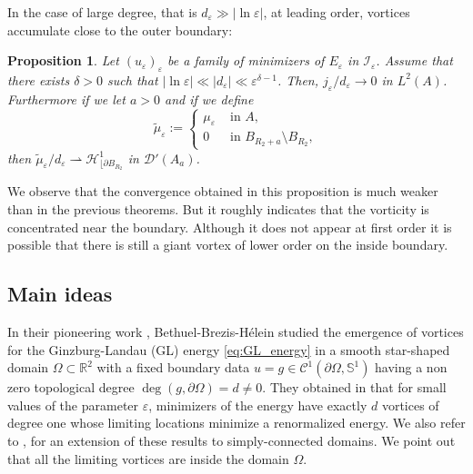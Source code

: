 \documentclass[12pt,reqno]{amsart}
\newtheorem{theorem}{Theorem}[section]
\newtheorem{proposition}[theorem]{Proposition}
\def\C{{\mathcal C}}
\def \O{{\Omega}}
\def\I{{\mathcal I}}
\def\e {{\varepsilon}}
\def \p {\partial}
\newcommand{\R}{\mathbb{R}}
\numberwithin{equation}{section}
\begin{document}
%
% 

In the case of large degree, that is \(d_\e \gg |\ln \e|\), at leading order, vortices accumulate close to the outer boundary:
 \begin{proposition}\label{th:main_0_case_d_big}
 Let \( (u_\e)_\e\) be a family of minimizers of \(E_\e\) in \(\I_\e\). Assume that there exists \(\delta>0\) such that \( |\ln \e| \ll |d_\e| \ll \e^{\delta-1}    \). Then,
 \(j_\e/d_\e \rightarrow 0\) in \(L^2(A)\). Furthermore if we let \(a>0\) and if we define
\begin{equation*}
\tilde{\mu}_\e:=\begin{cases}
\mu_\e & \text{ in } A, \\
0 & \text{ in } B_{R_2+a}\setminus B_{R_2},
\end{cases}
\end{equation*} 
  then \(\tilde{\mu}_\e/d_\e\rightharpoonup \mathcal{H}^1_{\lfloor \p B_{R_2}}\) in \(\mathcal{D}'(A_a)\).
 \end{proposition} 
 We observe that the convergence obtained in this proposition is much weaker than in the previous theorems. But it roughly indicates that the vorticity is concentrated near the boundary. Although it does not appear at first order it is possible that there is still a giant vortex of lower order on the inside boundary.


\subsection{Main ideas}

In their pioneering work \cite{BBH}, Bethuel-Brezis-H\'elein studied the emergence of vortices for the Ginzburg-Landau (GL) energy
 \eqref{eq:GL_energy} in a smooth star-shaped domain \(\O\subset \R^2\) with a fixed boundary data \(u=g\in \C^1(\p \O,\mathbb{S}^1)\) having a non zero topological degree \(\deg (g,\p \O)=d\neq 0\). They obtained in \cite{BBH} that for small values of the parameter \(\e\), minimizers of the energy have exactly \(d\) vortices of degree one whose limiting locations minimize a renormalized energy. We also refer to \cite{Struwe_1994}, \cite{delPino_Felmer_1998} for an extension of these results to simply-connected domains. We point out that all the limiting vortices are inside the domain \(\O\). 
 
\end{document}
